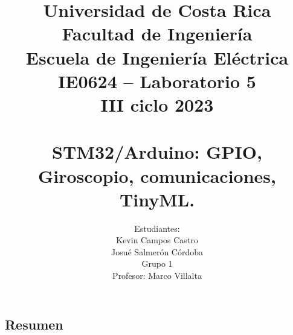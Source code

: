 \documentclass[12pt,a4paper]{article}
\author{Estudiantes:\\ Kevin Campos Castro\\ Josué Salmerón Córdoba  \\{\small Grupo 1}\\ Profesor:  Marco Villalta  \vspace*{3.0in}}
\title{Universidad de Costa Rica\\{\small Facultad de Ingeniería\\Escuela de Ingeniería Eléctrica\\IE0624 – Laboratorio 5\\III ciclo 2023\\\vspace*{0.55in}}\\ STM32/Arduino: GPIO, Giroscopio, comunicaciones, TinyML. \vspace*{1.35in}}
\begin{document}
 

\maketitle  
\thispagestyle{empty}%
\renewcommand{\thepage}{\roman{page}}
\newpage
\tableofcontents
\newpage
\listoffigures 
\newpage
\listoftables  
\newpage
\renewcommand{\thepage}{\arabic{page}} 
\setcounter{page}{1}
\begin{center}
\section{Resumen}
\end{center}



   
\newpage  


%





\newpage 


 
\end{document}

